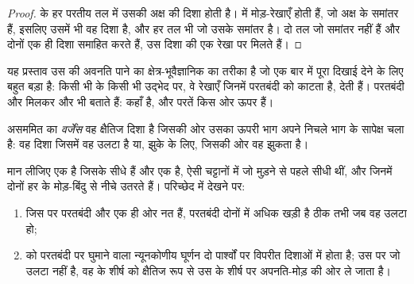\begin{proof}
 के हर परतीय तल में उसकी अक्ष की दिशा होती है।  में मोड़-रेखाएँ होती हैं, जो अक्ष के समांतर हैं, इसलिए उसमें भी वह दिशा है, और हर  तल भी जो उसके समांतर है। दो तल जो समांतर नहीं हैं और दोनों एक ही दिशा समाहित करते हैं, उस दिशा की एक रेखा पर मिलते हैं।
\end{proof}

यह प्रस्ताव उस  की अवनति पाने का क्षेत्र-भूवैज्ञानिक का तरीका है जो एक बार में पूरा दिखाई देने के लिए बहुत बड़ा है: किसी भी  के किसी भी उद्भेद पर, वे रेखाएँ जिनमें  परतबंदी को काटता है,  देती हैं। परतबंदी और  मिलकर और भी बताते हैं:  कहाँ है, और परतें किस ओर ऊपर हैं।

\begin{definition}[वर्जेंस]\label{def:b1:faults-folds-fabrics:vergence}
असममित  का \emph{वर्जेंस} वह क्षैतिज दिशा है जिसकी ओर उसका ऊपरी भाग अपने निचले भाग के सापेक्ष चला है: वह दिशा जिसमें वह उलटा है या, झुके  के लिए, जिसकी ओर वह झुकता है।
\end{definition}

\begin{proposition}\label{prop:b1:faults-folds-fabrics:cleavage-bedding}
मान लीजिए एक  है जिसके सीधे  हैं और एक  है, ऐसी चट्टानों में जो मुड़ने से पहले सीधी थीं, और जिनमें दोनों  हर  के मोड़-बिंदु से नीचे उतरते हैं। परिच्छेद में देखने पर:
\begin{enumerate}[label=(\alph*)]
  \item जिस  पर परतबंदी और  एक ही ओर नत हैं, परतबंदी दोनों में अधिक खड़ी है ठीक तभी जब वह  उलटा हो;
  \item {} को परतबंदी पर घुमाने वाला न्यूनकोणीय घूर्णन दो पार्श्वों पर विपरीत दिशाओं में होता है; उस  पर जो उलटा नहीं है, वह  के शीर्ष को क्षैतिज रूप से उस  के शीर्ष पर अपनति-मोड़ की ओर ले जाता है।
\end{enumerate}
\end{proposition}

